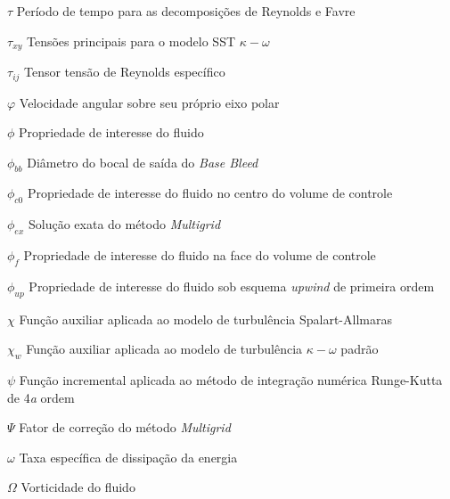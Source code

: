 \begin{simbolos}
  \item[\(\tau\)] Período de tempo para as decomposições de Reynolds e Favre
  \item[\(\tau_{xy}\)] Tensões principais para o modelo SST \(\kappa-\omega\)
  \item[\(\tau_{ij}\)] Tensor tensão de Reynolds específico
  \item[\(\varphi\)] Velocidade angular sobre seu próprio eixo polar
  \item[\(\phi\)] Propriedade de interesse do fluido
  \item[\(\phi_{bb}\)] Diâmetro do bocal de saída do \textit{Base Bleed}
  \item[\(\phi_{c0}\)] Propriedade de interesse do fluido no centro do volume de controle
  \item[\(\phi_{ex}\)] Solução exata do método \textit{Multigrid}
  \item[\(\phi_f\)] Propriedade de interesse do fluido na face do volume de controle
  \item[\(\phi_{up}\)] Propriedade de interesse do fluido sob esquema \textit{upwind} de primeira ordem
  \item[\(\chi\)] Função auxiliar aplicada ao modelo de turbulência Spalart-Allmaras
  \item[\(\chi_w\)] Função auxiliar aplicada ao modelo de turbulência \(\kappa-\omega\) padrão
  \item[\(\psi\)] Função incremental aplicada ao método de integração numérica Runge-Kutta de 4\emph{a} ordem
  \item[\(\Psi\)] Fator de correção do método \textit{Multigrid}
  \item[\(\omega\)] Taxa específica de dissipação da energia
  \item[\(\Omega\)] Vorticidade do fluido
\end{simbolos}